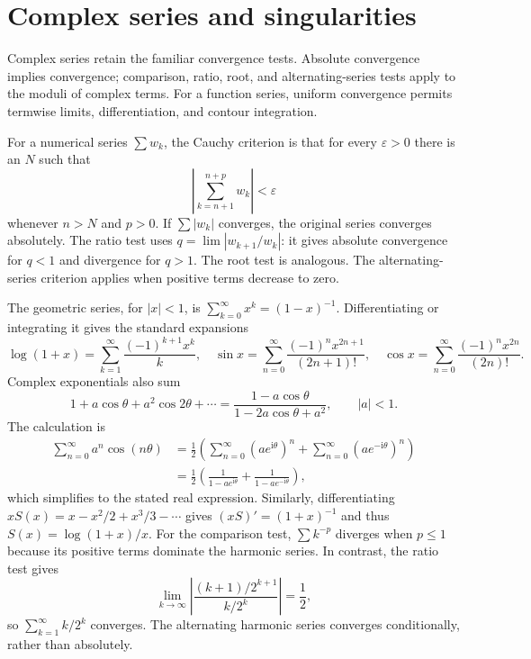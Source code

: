 \section{Complex series and singularities}

Complex series retain the familiar convergence tests. Absolute convergence implies convergence; comparison, ratio, root, and alternating-series tests apply to the moduli of complex terms. For a function series, uniform convergence permits termwise limits, differentiation, and contour integration.

For a numerical series $\sum w_k$, the Cauchy criterion is that for every $\varepsilon>0$ there is an $N$ such that
\begin{equation}
\left|\sum_{k=n+1}^{n+p}w_k\right|<\varepsilon
\end{equation}
whenever $n>N$ and $p>0$. If $\sum|w_k|$ converges, the original series converges absolutely. The ratio test uses $q=\lim|w_{k+1}/w_k|$: it gives absolute convergence for $q<1$ and divergence for $q>1$. The root test is analogous. The alternating-series criterion applies when positive terms decrease to zero.

The geometric series, for $|x|<1$, is $\sum_{k=0}^\infty x^k=(1-x)^{-1}$. Differentiating or integrating it gives the standard expansions
\begin{equation}
\log(1+x)=\sum_{k=1}^\infty\frac{(-1)^{k+1}x^k}{k},
\quad
\sin x=\sum_{n=0}^\infty\frac{(-1)^nx^{2n+1}}{(2n+1)!},
\quad
\cos x=\sum_{n=0}^\infty\frac{(-1)^nx^{2n}}{(2n)!}.
\end{equation}
Complex exponentials also sum
\begin{equation}
1+a\cos\theta+a^2\cos2\theta+\cdots
=\frac{1-a\cos\theta}{1-2a\cos\theta+a^2},\qquad |a|<1.
\end{equation}
The calculation is
\begin{align}
\sum_{n=0}^\infty a^n\cos(n\theta)
&=\frac12\left(\sum_{n=0}^\infty(ae^{\mathrm{i}\theta})^n+\sum_{n=0}^\infty(ae^{-\mathrm{i}\theta})^n\right)\nonumber\\
&=\frac12\left(\frac{1}{1-ae^{\mathrm{i}\theta}}+\frac{1}{1-ae^{-\mathrm{i}\theta}}\right),
\end{align}
which simplifies to the stated real expression. Similarly, differentiating $xS(x)=x-x^2/2+x^3/3-\cdots$ gives $(xS)'=(1+x)^{-1}$ and thus $S(x)=\log(1+x)/x$.
For the comparison test, $\sum k^{-p}$ diverges when $p\leq1$ because its positive terms dominate the harmonic series. In contrast, the ratio test gives
\begin{equation}
\lim_{k\to\infty}\left|\frac{(k+1)/2^{k+1}}{k/2^k}\right|=\frac12,
\end{equation}
so $\sum_{k=1}^\infty k/2^k$ converges. The alternating harmonic series converges conditionally, rather than absolutely.

